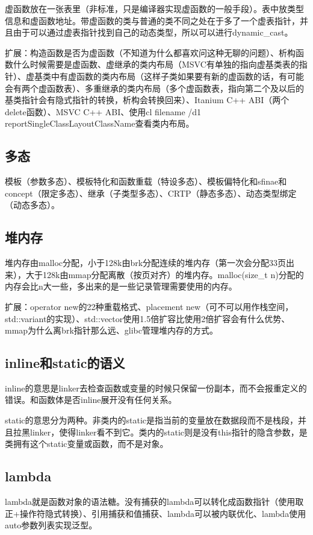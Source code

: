 虚函数放在一张表里（非标准，只是编译器实现虚函数的一般手段）。表中放类型信息和虚函数地址。带虚函数的类与普通的类不同之处在于多了一个虚表指针，并且由于可以通过虚表指针找到自己的动态类型，所以可以进行dynamic\_cast。

扩展：构造函数是否为虚函数（不知道为什么都喜欢问这种无聊的问题）、析构函数什么时候需要是虚函数、虚继承的类内布局（MSVC有单独的指向虚基类表的指针）、虚基类中有虚函数的类内布局（这样子类如果要有新的虚函数的话，有可能会有两个虚函数表）、多重继承的类内布局（多个虚函数表，指向第二个及以后的基类指针会有隐式指针的转换，析构会转换回来）、Itanium C++ ABI（两个delete函数）、MSVC C++ ABI、使用cl filename /d1 reportSingleClassLayoutClassName查看类内布局。

\subsection{多态}

模板（参数多态）、模板特化和函数重载（特设多态）、模板偏特化和sfinae和concept（限定多态）、继承（子类型多态）、CRTP（静态多态）、动态类型绑定（动态多态）。

\subsection{堆内存}

堆内存由malloc分配，小于128k由brk分配连续的堆内存（第一次会分配33页出来），大于128k由mmap分配离散（按页对齐）的堆内存。malloc(size\_t n)分配的内存会比n大一些，多出来的是一些记录管理需要使用的内存。

扩展：operator new的22种重载格式、placement new（可不可以用作栈空间，std::variant的实现）、std::vector使用1.5倍扩容比使用2倍扩容会有什么优势、mmap为什么离brk指针那么远、glibc管理堆内存的方式。

\subsection{inline和static的语义}
inline的意思是linker去检查函数或变量的时候只保留一份副本，而不会报重定义的错误。和函数体是否inline展开没有任何关系。

static的意思分为两种。非类内的static是指当前的变量放在数据段而不是栈段，并且拉黑linker，使得linker看不到它。类内的static则是没有this指针的隐含参数，是类拥有这个static变量或函数，而不是对象。

\subsection{lambda}
lambda就是函数对象的语法糖。没有捕获的lambda可以转化成函数指针（使用取正+操作符隐式转换）、引用捕获和值捕获、lambda可以被内联优化、lambda使用auto参数列表实现泛型。

